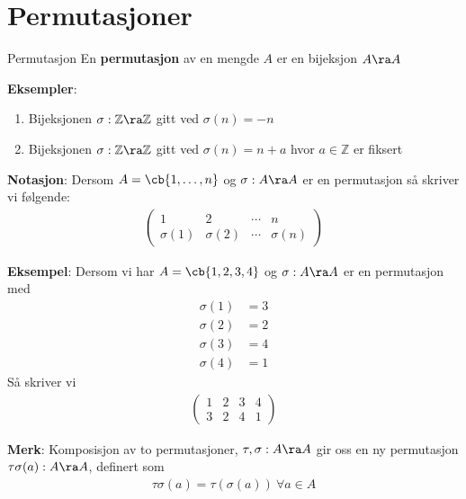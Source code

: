 \section{Permutasjoner}

\begin{definition}{Permutasjon}{}
	En \textbf{permutasjon} av en mengde $A$ er en bijeksjon $A\ra A$
\end{definition}

\textbf{Eksempler}:
\begin{enumerate}
	\item Bijeksjonen $\sigma : \mathbb{Z} \ra \mathbb{Z}$ gitt ved $\sigma(n)=-n$
	\item Bijeksjonen $\sigma : \mathbb{Z} \ra \mathbb{Z}$ gitt ved $\sigma(n)=n+a$ hvor
	      $a\in \mathbb{Z}$ er fiksert
\end{enumerate}

\textbf{Notasjon}: Dersom $A=\cb{1, \dots, n}$ og $\sigma : A\ra A$ er en permutasjon så skriver
vi følgende:
\begin{align}
	\begin{pmatrix} 1 & 2 & \cdots & n \\ \sigma(1) & \sigma(2) & \cdots & \sigma(n) \end{pmatrix}
\end{align}

\textbf{Eksempel}: Dersom vi har $A=\cb{1, 2, 3, 4}$ og $\sigma : A\ra A$ er en permutasjon med
\begin{align}
	\sigma(1) & =3 \\
	\sigma(2) & =2 \\
	\sigma(3) & =4 \\
	\sigma(4) & =1
\end{align}
Så skriver vi
\begin{align}
	\begin{pmatrix} 1 & 2 & 3 & 4 \\ 3 & 2 & 4 & 1 \end{pmatrix}
\end{align}

\textbf{Merk}: Komposisjon av to permutasjoner, $\tau, \sigma : A \ra A$ gir oss en ny permutasjon
$\tau\sigma(a):A\ra A$, definert som
\begin{align}
	\tau\sigma(a)= \tau(\sigma(a))\ \forall a\in A
\end{align}

